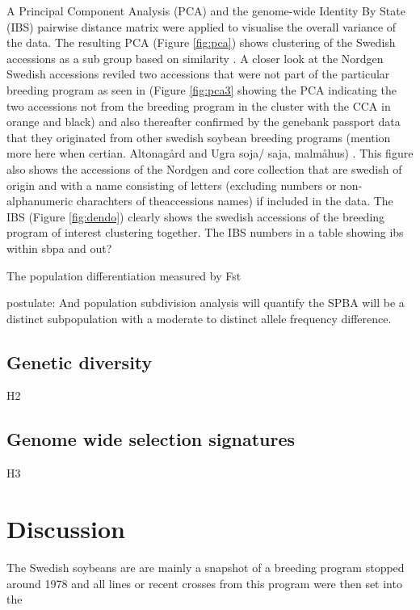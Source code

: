 \documentclass[9pt, onecolumn,twoside]{gsajnl}
\begin{document}
A Principal Component Analysis (PCA) and the genome-wide Identity By State (IBS) pairwise distance matrix were applied to visualise the overall variance of the data. The resulting PCA (Figure \ref{fig:pca}) shows clustering of the Swedish accessions as a sub group based on similarity . A closer look at the Nordgen Swedish accessions reviled two accessions that were not part of the particular breeding program as seen in (Figure \ref{fig:pca3}  showing the PCA indicating the two accessions not from the breeding program in the cluster with the CCA in orange and black)  and also thereafter confirmed by the genebank passport data that they originated from other swedish soybean breeding programs (mention more here when certian. Altonagård and Ugra soja/ saja, malmåhus) .  This figure also shows the accessions of the Nordgen and core collection that are swedish of origin and with a name consisting of letters (excluding numbers or non-alphanumeric charachters of theaccessions names) if included in the data. 
The IBS (Figure  \ref{fig:dendo}) clearly shows the swedish accessions of the breeding program of interest clustering together. The  
 IBS numbers in a table showing ibs within sbpa and out?

The population differentiation measured by Fst








postulate: And population subdivision analysis will quantify the SPBA will be a distinct subpopulation with a moderate to distinct allele frequency difference.

\subsection{Genetic diversity} 
H2


\subsection{Genome wide selection signatures} 
H3



\section{Discussion}

The Swedish soybeans are are mainly a snapshot of a breeding program stopped around 1978 and all lines or recent crosses from this program were then set into the  
\end{document}
